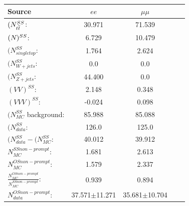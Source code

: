 \begin{table}[htbp]
\centering
\begin{tabular}{l | cccc}
\hline
Source &  $ee$ & $\mu\mu$  \\ 
\hline
$(N_{t\overline{t}}^{SS}$: & 30.971 & 71.539   \\
$(N_{\tt})^{SS}$: & 6.729 & 10.479   \\ 
$(N_{single top}^{SS}$: & 1.764 & 2.624   \\
$(N_{W+jets}^{SS}$: & 0.0 & 0.0   \\
$(N_{Z+jets}^{SS}$: & 44.400 & 0.0   \\
$(VV)^{SS}$: & 2.148 & 0.348  \\
$(VVV)^{SS}$: & -0.024 & 0.098 \\
\hline
$(N_{MC}^{SS}$ background: & 85.988 & 85.088  \\ 
$(N_{data}^{SS}$: & 126.0 & 125.0  \\ 
\hline
$(N_{data}^{SS} - (N_{MC}^{SS}$: & 40.012 & 39.912 \\
\hline
$N_{MC}^{SS non-prompt}$: & 1.681 & 2.613 \\
$N_{MC}^{OS non-prompt}$: & 1.579 & 2.337 \\
$\frac{N_{MC}^{OS non-prompt}}{N_{MC}^{SS non-prompt}}$: & 0.939 & 0.894 \\
\hline
$N_{data}^{OS non-prompt}$: & 37.571$\pm$11.271 & 35.681$\pm$10.704 \\
\hline
\end{tabular}
\label{tab:fakeLeptonYields}
\end{table}

